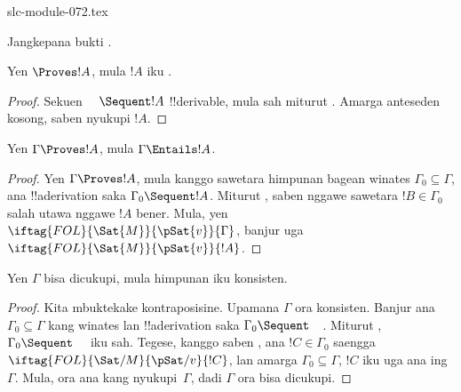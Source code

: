 \begin{filecontents*}[overwrite]{slc-module-072.tex}
\begin{prob}
Jangkepana bukti .
\end{prob}
\tagendprob

\begin{cor}
Yen $\Proves !A$, mula $!A$ iku .
\end{cor}
\begin{proof}
Sekuen $\quad\Sequent !A$ !!{derivable}, mula sah miturut
. Amarga anteseden kosong, saben
 nyukupi $!A$.
\end{proof}

\begin{cor}
Yen $\Gamma \Proves !A$, mula $\Gamma \Entails !A$.
\end{cor}

\begin{proof}
Yen $\Gamma \Proves !A$, mula kanggo sawetara himpunan bagean winates
$\Gamma_0 \subseteq \Gamma$, ana !!a{derivation} saka $\Gamma_0
\Sequent !A$. Miturut , saben
nggawe sawetara $!B \in \Gamma_0$ salah utawa nggawe $!A$ bener. Mula,
yen $\iftag{FOL}{\Sat{M}}{\pSat{v}}{\Gamma}$, banjur uga
$\iftag{FOL}{\Sat{M}}{\pSat{v}}{!A}$.
\end{proof}

\begin{cor}
Yen $\Gamma$ bisa dicukupi, mula himpunan iku konsisten.
\end{cor}

\begin{proof}
Kita mbuktekake kontraposisine. Upamana $\Gamma$ ora konsisten. Banjur
ana $\Gamma_0 \subseteq \Gamma$ kang winates lan !!a{derivation} saka
$\Gamma_0 \Sequent \quad$. Miturut
, $\Gamma_0 \Sequent \quad$ iku sah.
Tegese, kanggo saben
,
ana $!C \in \Gamma_0$ saengga
$\iftag{FOL}{\Sat/{M}}{\pSat/{v}}{!C}$, lan amarga $\Gamma_0
\subseteq \Gamma$, $!C$ iku uga ana ing~$\Gamma$. Mula, ora ana
 kang nyukupi~$\Gamma$, dadi
$\Gamma$ ora bisa dicukupi.
\end{proof}


\end{filecontents*}

